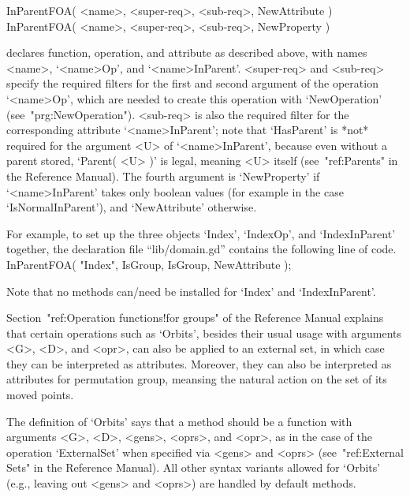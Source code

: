 \>InParentFOA( <name>, <super-req>, <sub-req>, NewAttribute )
\>InParentFOA( <name>, <super-req>, <sub-req>, NewProperty )

declares function, operation, and attribute as described above,
with names <name>, `<name>Op', and `<name>InParent'.
<super-req> and <sub-req> specify the required filters for the first and
second argument of the operation `<name>Op',
which are needed to create this operation with `NewOperation'
(see~"prg:NewOperation").
<sub-req> is also the required filter for the corresponding attribute
`<name>InParent';
note that `HasParent' is *not* required for the argument <U> of
`<name>InParent', because even without a parent stored,
`Parent( <U> )' is legal, meaning <U> itself
(see~"ref:Parents" in the Reference Manual).
The fourth argument is `NewProperty' if `<name>InParent' takes only
boolean values (for example in the case `IsNormalInParent'),
and `NewAttribute' otherwise.

For example, to set up the three objects `Index', `IndexOp',
and `IndexInParent' together,
the declaration file ``lib/domain.gd'' contains the following line of code.
\begintt
InParentFOA( "Index", IsGroup, IsGroup, NewAttribute );
\endtt

Note that no methods can/need be installed for `Index' and
`IndexInParent'.



Section~"ref:Operation  functions!for  groups"  of  the  Reference Manual
explains that certain operations such as `Orbits',
besides their usual usage with arguments <G>, <D>, and <opr>,
can also be applied to an external set,
in which case they can be interpreted as attributes.
Moreover, they can also be interpreted as attributes for permutation
group, meansing the natural action on the set of its moved points.

The definition of `Orbits' says that a method should be a function
with arguments <G>, <D>, <gens>, <oprs>, and <opr>,
as in the case of the operation `ExternalSet' when specified via <gens>
and <oprs> (see~"ref:External Sets" in the Reference Manual).
All other syntax variants allowed for `Orbits' (e.g., leaving
out <gens> and <oprs>) are handled by default methods.

